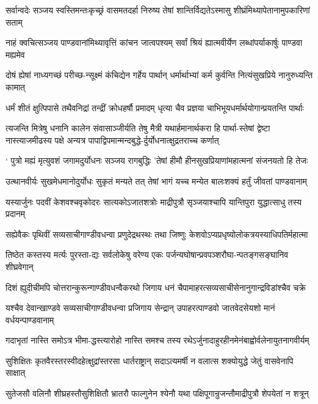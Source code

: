 \twolineshloka
{सर्वान्वदेः सञ्जय स्वस्तिमन्तःकृच्छ्रं वासमतदर्हा निरुष्य}
{तेषां शान्तिर्विद्यतेऽस्मासु शीघ्रंमिथ्यापेतानामुपकारिणां सताम्}


\twolineshloka
{नाहं क्वचित्सञ्जय पाण्डवानांमिथ्यावृत्तिं कांचन जात्वपश्यम्}
{सर्वां श्रियं ह्यात्मवीर्येण लब्धांपर्याकार्षुः पाण्डवा मह्यमेव}


\twolineshloka
{दोषं ह्येषां नाध्यगच्छं परीच्छ-न्सूक्ष्मं कंचिद्येन गर्हेय पार्थान्}
{धर्मार्थाभ्यां कर्म कुर्वन्ति नित्यंसुखप्रिये नानुरुध्यन्ति कामात्}


\twolineshloka
{धर्मं शीतं क्षुत्पिपासे तथैवनिद्रां तन्द्रीं क्रोधहर्षौ प्रमादम्}
{धृत्या चैव प्रज्ञया चाभिभूयधर्मार्थयोगान्प्रयतन्ति पार्थाः}


\threelineshloka
{त्यजन्ति मित्रेषु धनानि कालेन संवासाञ्जीर्यति तेषु मैत्री}
{यथार्हमानार्थकरा हि पार्था-स्तेषां द्वेष्टा नास्त्याजमीढस्य पक्षे}
{अन्यत्र पापाद्विपमान्मन्दबुद्धे-र्दुर्योधनात्क्षुद्रतराच्च कर्णात्}


\twolineshloka
{` पुत्रो मह्यं मृत्युवशं जगामदुर्योधनः सञ्जय रागबुद्धिः}
{'तेषां हीमौ हीनसुखप्रियाणांमहात्मनां संजनयतो हि तेजः}


\twolineshloka
{उत्थानवीर्यः सुखमेधमानोदुर्योधः सुकृतं मन्यते तत्}
{तेषां भागं यच्च मन्येत बालःशक्यं हर्तुं जीवतां पाण्डवानाम्}


\twolineshloka
{यस्यार्जुनः पदवीं केशवश्चवृकोदरः सात्यकोऽजातशत्रोः}
{माद्रीपुत्रौ सृञ्जयाश्चापि यान्तिपुरा युद्धात्साधु तस्य प्रदानम्}


\twolineshloka
{सह्येवैकः पृथिवीं सव्यसाचीगाण्डीवधन्वा प्रणुदेद्रथस्थः}
{तथा जिष्णुः केशवोऽप्यप्रधृष्योलोकत्रयस्याधिपतिर्महात्मा}


\twolineshloka
{तिष्ठेत कस्तस्य मर्त्यः पुरस्ता-द्यः सर्वलोकेषु वरेण्य एकः}
{पर्जन्यघोषान्प्रवपञ्शरौघा-न्पतङ्गसङ्घानिव शीघ्रवेगान्}


\twolineshloka
{दिशं ह्युदीचीमपि चोत्तरान्कुरून्गाण्डीवधन्वैकरथो जिगाय}
{धनं चैपामाहरत्सव्यसाचीसेनानुगान्द्रविडांश्चैव चक्रे}


\twolineshloka
{यश्चैव देवान्खाण्डवे सव्यसाचीगाण्डीवधन्वा प्रजिगाय सेन्द्रान्}
{उपाहरत्पाण्डवो जातवेदसेयशो मानं वर्धयन्पाण्डवानाम्}


\twolineshloka
{गदाभृतां नास्ति समोऽत्र भीमा-द्धस्त्यारोहो नास्ति समश्च तस्य}
{रथेऽर्जुनादाहुरहीनमेनंबाह्वोर्वलेनायुतनागवीर्यम्}


\twolineshloka
{सुशिक्षितः कृतवैरस्तरस्वीदहेत्क्षुद्रांस्तरसा धार्तराष्ट्रान्}
{सदाऽत्यमर्षी न वलात्स शक्योयुद्धे जेतुं वासवेनापि साक्षात्}


\twolineshloka
{सुतेजसौ वलिनौ शीघ्रहस्तौसुशिक्षितौ भ्रातरौ फाल्गुनेन}
{श्येनौ यथा पक्षिपूगान्रुजन्तौमाद्रीपुत्रौ शेपयेतां न शत्रून्}


